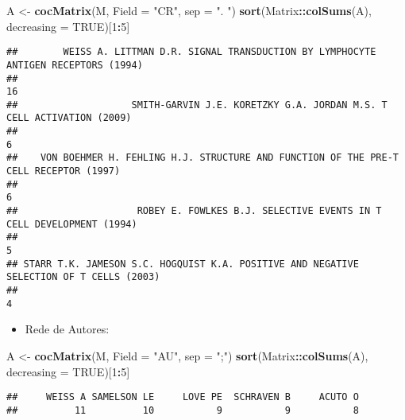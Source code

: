 \documentclass[]{article}
\newenvironment{Shaded}{\begin{snugshade}}{\end{snugshade}}
\newcommand{\DataTypeTok}[1]{\textcolor[rgb]{0.13,0.29,0.53}{#1}}
\newcommand{\DecValTok}[1]{\textcolor[rgb]{0.00,0.00,0.81}{#1}}
\newcommand{\KeywordTok}[1]{\textcolor[rgb]{0.13,0.29,0.53}{\textbf{#1}}}
\newcommand{\NormalTok}[1]{#1}
\newcommand{\OperatorTok}[1]{\textcolor[rgb]{0.81,0.36,0.00}{\textbf{#1}}}
\newcommand{\OtherTok}[1]{\textcolor[rgb]{0.56,0.35,0.01}{#1}}
\newcommand{\StringTok}[1]{\textcolor[rgb]{0.31,0.60,0.02}{#1}}
\providecommand{\tightlist}{%
  \setlength{\itemsep}{0pt}\setlength{\parskip}{0pt}}
\begin{document}
\begin{Shaded}
\begin{Highlighting}[]
\NormalTok{A <-}\StringTok{ }\KeywordTok{cocMatrix}\NormalTok{(M, }\DataTypeTok{Field =} \StringTok{"CR"}\NormalTok{, }\DataTypeTok{sep =} \StringTok{".  "}\NormalTok{)}
\KeywordTok{sort}\NormalTok{(Matrix}\OperatorTok{::}\KeywordTok{colSums}\NormalTok{(A), }\DataTypeTok{decreasing =} \OtherTok{TRUE}\NormalTok{)[}\DecValTok{1}\OperatorTok{:}\DecValTok{5}\NormalTok{]}
\end{Highlighting}
\end{Shaded}

\begin{verbatim}
##        WEISS A. LITTMAN D.R. SIGNAL TRANSDUCTION BY LYMPHOCYTE ANTIGEN RECEPTORS (1994) 
##                                                                                      16 
##                    SMITH-GARVIN J.E. KORETZKY G.A. JORDAN M.S. T CELL ACTIVATION (2009) 
##                                                                                       6 
##    VON BOEHMER H. FEHLING H.J. STRUCTURE AND FUNCTION OF THE PRE-T CELL RECEPTOR (1997) 
##                                                                                       6 
##                     ROBEY E. FOWLKES B.J. SELECTIVE EVENTS IN T CELL DEVELOPMENT (1994) 
##                                                                                       5 
## STARR T.K. JAMESON S.C. HOGQUIST K.A. POSITIVE AND NEGATIVE SELECTION OF T CELLS (2003) 
##                                                                                       4
\end{verbatim}

\begin{itemize}
\tightlist
\item
  Rede de Autores:
\end{itemize}

\begin{Shaded}
\begin{Highlighting}[]
\NormalTok{A <-}\StringTok{ }\KeywordTok{cocMatrix}\NormalTok{(M, }\DataTypeTok{Field =} \StringTok{"AU"}\NormalTok{, }\DataTypeTok{sep =} \StringTok{";"}\NormalTok{)}
\KeywordTok{sort}\NormalTok{(Matrix}\OperatorTok{::}\KeywordTok{colSums}\NormalTok{(A), }\DataTypeTok{decreasing =} \OtherTok{TRUE}\NormalTok{)[}\DecValTok{1}\OperatorTok{:}\DecValTok{5}\NormalTok{]}
\end{Highlighting}
\end{Shaded}

\begin{verbatim}
##     WEISS A SAMELSON LE     LOVE PE  SCHRAVEN B     ACUTO O 
##          11          10           9           9           8
\end{verbatim}
\end{document}

